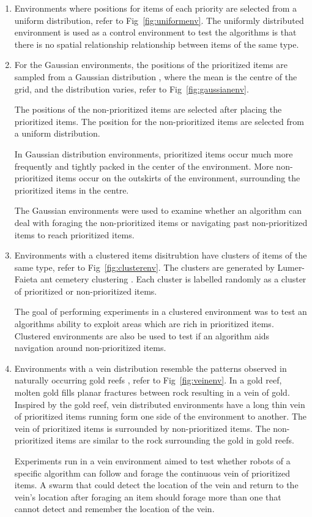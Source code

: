 \begin{enumerate}

\item Environments where positions for items of each priority are selected from a uniform distribution, refer to Fig~\ref{fig:uniformenv}. The uniformly distributed environment is used as a control environment to test the algorithms is that there is no spatial relationship relationship between items of the same type.

\item For the Gaussian environments, the positions of the prioritized items are sampled from a Gaussian distribution , where the mean is the centre of the grid, and the distribution varies, refer to Fig~\ref{fig:gaussianenv}. 

The positions of the non-prioritized items are selected after placing the prioritized items. The position for the non-prioritized items are selected from a uniform distribution. 

In Gaussian distribution environments, prioritized items occur much more frequently and tightly packed in the center of the environment. More non-prioritized items occur on the outskirts of the environment, surrounding the prioritized items in the centre.

The Gaussian environments were used to examine whether an algorithm can deal with foraging the non-prioritized items  or navigating past non-prioritized items to reach prioritized items. 


\item Environments with a clustered items disitrubtion  have clusters of items of the same type, refer to Fig~\ref{fig:clusterenv}. The clusters are generated by Lumer-Faieta ant cemetery clustering \cite{lumer1994diversity}. Each cluster is labelled randomly as a cluster of prioritized or non-prioritized items. 

The goal of performing experiments in a clustered environment was to test an algorithms ability to exploit areas which are rich in prioritized items. Clustered environments are also be used to test if an algorithm aids navigation around non-prioritized items. 

\item Environments with a vein distribution resemble the patterns observed in naturally occurring gold reefs \cite{frimmel2002recent}, refer to Fig~\ref{fig:veinenv}. In a gold reef, molten gold fills planar fractures between rock resulting in a vein of gold. Inspired by the gold reef, vein distributed environments have a long thin vein of prioritized items running form one side of the environment to another. The vein of prioritized items is surrounded by non-prioritized items. The non-prioritized items are similar to the rock surrounding the gold in gold reefs.

Experiments run in a vein environment aimed to test whether robots of a specific algorithm can follow and forage the continuous vein of prioritized items. A swarm that could detect the location of the vein and return to the vein's location after foraging an item should forage more than one that cannot detect and remember the location of the vein.

\end{enumerate} 

